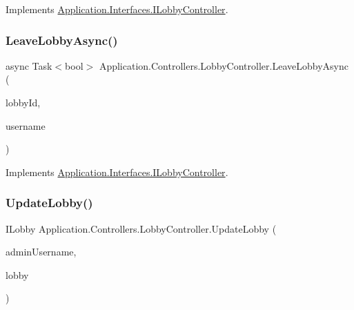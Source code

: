 Implements \mbox{\hyperlink{interface_application_1_1_interfaces_1_1_i_lobby_controller_ad95e5c656813094f7abec7b81ea568e1}{Application.\+Interfaces.\+I\+Lobby\+Controller}}.

\mbox{\label{class_application_1_1_controllers_1_1_lobby_controller_a7f0fb3932a42b76d5e4a9788aa0510e0}} 
\subsubsection{\texorpdfstring{Leave\+Lobby\+Async()}{LeaveLobbyAsync()}}
{\footnotesize\ttfamily async Task$<$bool$>$ Application.\+Controllers.\+Lobby\+Controller.\+Leave\+Lobby\+Async (\begin{DoxyParamCaption}\item[{string}]{lobby\+Id,  }\item[{string}]{username }\end{DoxyParamCaption})}



Implements \mbox{\hyperlink{interface_application_1_1_interfaces_1_1_i_lobby_controller_a46975c7e9219d5324f786542a23d9e7e}{Application.\+Interfaces.\+I\+Lobby\+Controller}}.

\mbox{\label{class_application_1_1_controllers_1_1_lobby_controller_a415b61b5c78ba52619ac4d3606ecc32e}} 
\subsubsection{\texorpdfstring{Update\+Lobby()}{UpdateLobby()}}
{\footnotesize\ttfamily I\+Lobby Application.\+Controllers.\+Lobby\+Controller.\+Update\+Lobby (\begin{DoxyParamCaption}\item[{string}]{admin\+Username,  }\item[{I\+Lobby}]{lobby }\end{DoxyParamCaption})}



